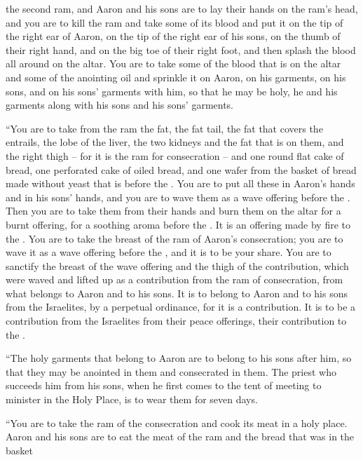 {the second
ram,
and Aaron
and his sons
are to lay
their hands
on
the ram’s
head,
and you are to kill
the ram
and take
some of its blood
and put
it on
the tip
of the right ear
of Aaron,
on
the tip
of the right
ear
of his sons,
on
the thumb
of their right
hand,
and on
the big toe
of their right
foot,
and then splash
the blood
all around
on
the altar.
You are to take
some
of the blood
that
is on
the altar
and some of the anointing
oil
and sprinkle
it on
Aaron,
on
his garments,
on
his sons,
and on
his sons’
garments
with
him, so that
he may be holy,
he and his garments
along with
his sons
and his sons’
garments.
\par }{\PP {}“You are to take
from
the ram
the fat,
the fat tail, the fat that covers the entrails, the lobe of the liver, the two kidneys and the fat that is on them, and the right thigh – for it is the ram for consecration –
and one
round
flat cake of
bread,
one
perforated
cake of oiled
bread,
and one
wafer
from the basket
of bread made without yeast
that
is before
the {}.
You are to put
all
these in Aaron’s
hands
and in his sons’
hands,
and you are to wave
them as a wave offering
before
the {}.
Then you are to take
them
from their hands
and burn
them on the altar
for a burnt offering,
for a soothing
aroma
before
the {}. It is
an offering made by fire
to the
{}.
You are to take
the
breast
of the ram
of Aaron’s
consecration;
you are to wave
it as a wave offering
before
the {}, and it is to be
your share.
You are to sanctify
the
breast
of the wave offering
and the thigh
of the contribution,
which
were waved
and lifted up
as a contribution from the ram
of consecration,
from what belongs
to Aaron
and to his sons.
It is to belong to Aaron
and to his sons
from the Israelites,
by a perpetual
ordinance,
for
it is a contribution.
It is to be
a contribution
from the
Israelites
from their peace offerings,
their contribution
to the
{}.
\par }{\PP {}“The holy
garments
that belong
to Aaron
are to belong to his sons
after
him, so that they may be anointed
in them and consecrated in them.
The priest
who succeeds
him from his sons,
when he first comes
to
the tent
of meeting
to minister
in the Holy
Place, is to wear
them for seven
days.
\par }{\PP {}“You are to take
the
ram
of the consecration
and cook
its meat
in a holy
place.
Aaron
and his sons
are to eat
the
meat
of the ram
and the
bread
that
was in the basket
}
